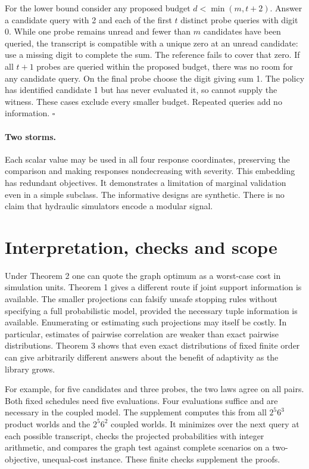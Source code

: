 \documentclass[11pt]{article}
\begin{document}
For the lower bound consider any proposed budget \(d<\min(m,t+2)\). Answer a candidate query with 2 and each of the first \(t\) distinct probe queries with digit 0. While one probe remains unread and fewer than \(m\) candidates have been queried, the transcript is compatible with a unique zero at an unread candidate: use a missing digit to complete the sum. The reference fails to cover that zero. If all \(t+1\) probes are queried within the proposed budget, there was no room for any candidate query. On the final probe choose the digit giving sum 1. The policy has identified candidate 1 but has never evaluated it, so cannot supply the witness. These cases exclude every smaller budget. Repeated queries add no information. \(\square\)

\paragraph{Two storms.} Each scalar value may be used in all four response coordinates, preserving the comparison and making responses nondecreasing with severity. This embedding has redundant objectives. It demonstrates a limitation of marginal validation even in a simple subclass. The informative designs are synthetic. There is no claim that hydraulic simulators encode a modular signal.

\newpage\section{Interpretation, checks and scope}
Under Theorem 2 one can quote the graph optimum as a worst-case cost in simulation units. Theorem 1 gives a different route if joint support information is available. The smaller projections can falsify unsafe stopping rules without specifying a full probabilistic model, provided the necessary tuple information is available. Enumerating or estimating such projections may itself be costly. In particular, estimates of pairwise correlation are weaker than exact pairwise distributions. Theorem 3 shows that even exact distributions of fixed finite order can give arbitrarily different answers about the benefit of adaptivity as the library grows.

For example, for five candidates and three probes, the two laws agree on all pairs. Both fixed schedules need five evaluations. Four evaluations suffice and are necessary in the coupled model. The supplement computes this from all \(2^5 6^3\) product worlds and the \(2^5 6^2\) coupled worlds. It minimizes over the next query at each possible transcript, checks the projected probabilities with integer arithmetic, and compares the graph test against complete scenarios on a two-objective, unequal-cost instance. These finite checks supplement the proofs.
\end{document}

